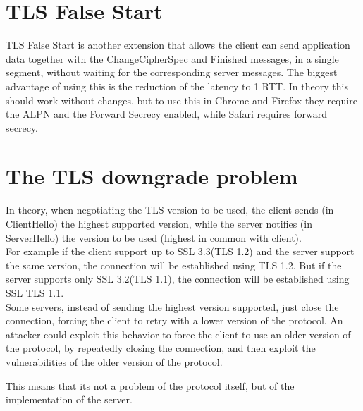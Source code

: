 \section{TLS False Start}
TLS False Start is another extension that allows the client can send
application data together with the ChangeCipherSpec and Finished
messages, in a single segment, without waiting for the corresponding
server messages. The biggest advantage of using this is the reduction
of the latency to 1 RTT. In theory this should work without changes,
but to use this in Chrome and Firefox they require the ALPN and the 
Forward Secrecy enabled, while Safari requires forward secrecy.

\section{The TLS downgrade problem}
In theory, when negotiating the TLS version to be used, the client
sends (in ClientHello) the highest supported version, while the server
notifies (in ServerHello) the version to be used (highest in common
with client).\\
For example if the client support up to SSL 3.3(TLS 1.2) and the
server support the same version, the connection will be established
using TLS 1.2. But if the server supports only SSL 3.2(TLS 1.1), the
connection will be established using SSL TLS 1.1.\\
Some servers, instead of sending the highest version supported, just
close the connection, forcing the client to retry with a lower version
of the protocol. An attacker could exploit this behavior to force the
client to use an older version of the protocol, by repeatedly closing
the connection, and then exploit the vulnerabilities of the older
version of the protocol.\\
\begin{boxH}
  This means that its not a problem of the protocol itself, but of the
  implementation of the server.
\end{boxH}

